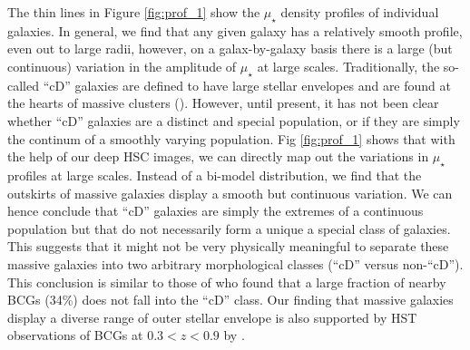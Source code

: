 \documentclass[a4paper,fleqn,usenatbib]{mnras}
\def\mden{{$\mu_{\star}$}}
\begin{document}
   The thin lines in Figure \ref{fig:prof_1} show the \mden{} density profiles of 
   individual galaxies. 
   In general, we find that any given galaxy has a relatively smooth profile, even out 
   to large radii, however, on a galax-by-galaxy basis there is a large (but continuous) 
   variation in the amplitude of \mden{} at large scales. 
   Traditionally, the so-called ``cD'' galaxies are defined to have large stellar 
   envelopes and are found at the hearts of massive clusters (\citealt{Matthews1964, 
   Schombert1988}). 
   However, until present, it has not been clear whether ``cD'' galaxies are a distinct 
   and special population, or if they are simply the continum of a smoothly varying 
   population. 
   Fig \ref{fig:prof_1} shows that with the help of our deep HSC images, we can directly 
   map out the variations in \mden{} profiles at large scales. 
   Instead of a bi-model distribution, we find that the outskirts of massive galaxies 
   display a smooth but continuous variation. 
   We can hence conclude that ``cD'' galaxies are simply the extremes of a continuous 
   population but that do not necessarily form a unique a special class of galaxies. 
   This suggests that it might not be very physically meaningful to separate these 
   massive galaxies into two arbitrary morphological classes (``cD'' versus non-``cD''). 
   This conclusion is similar to those of \citep{Zhao2015} who found that a large 
   fraction of nearby BCGs (34\%) does not fall into the ``cD'' class. 
   Our finding that massive galaxies display a diverse range of outer stellar 
   envelope is also supported by HST observations of BCGs at $0.3 < z <0.9$ 
   by \citealt{Bai2014}.
   
\end{document}

